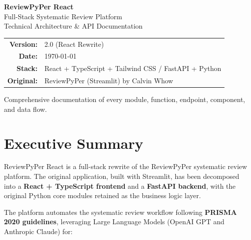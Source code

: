 \documentclass[11pt,a4paper]{article}
\begin{document}
\begin{titlepage}
\centering
\vspace*{2cm}
{\Huge\bfseries\color{primary} ReviewPyPer React\\[0.3cm]}
{\Large\color{secondary} Full-Stack Systematic Review Platform\\[0.5cm]}
{\large Technical Architecture \& API Documentation\\[2cm]}


\vspace{1.5cm}
{\large
\begin{tabular}{rl}
\textbf{Version:} & 2.0 (React Rewrite) \\
\textbf{Date:} & \today \\
\textbf{Stack:} & React + TypeScript + Tailwind CSS / FastAPI + Python \\
\textbf{Original:} & ReviewPyPer (Streamlit) by Calvin Whow \\
\end{tabular}
}

\vfill
{\small Comprehensive documentation of every module, function, endpoint, component, and data flow.}
\end{titlepage}

\tableofcontents
\newpage

\section{Executive Summary}

ReviewPyPer React is a full-stack rewrite of the ReviewPyPer systematic review platform. The original application, built with Streamlit, has been decomposed into a \textbf{React + TypeScript frontend} and a \textbf{FastAPI backend}, with the original Python core modules retained as the business logic layer.

The platform automates the systematic review workflow following \textbf{PRISMA 2020 guidelines}, leveraging Large Language Models (OpenAI GPT and Anthropic Claude) for:
\end{document}
